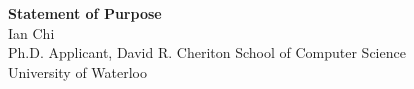 \documentclass[11pt]{article}
\begin{document}
\begin{center}
    {\Large \textbf{Statement of Purpose}}\\[4pt]
    {\large Ian Chi}\\[2pt]
    Ph.D. Applicant, David R. Cheriton School of Computer Science\\
    University of Waterloo
\end{center}

\vspace{1em}

\end{document}
